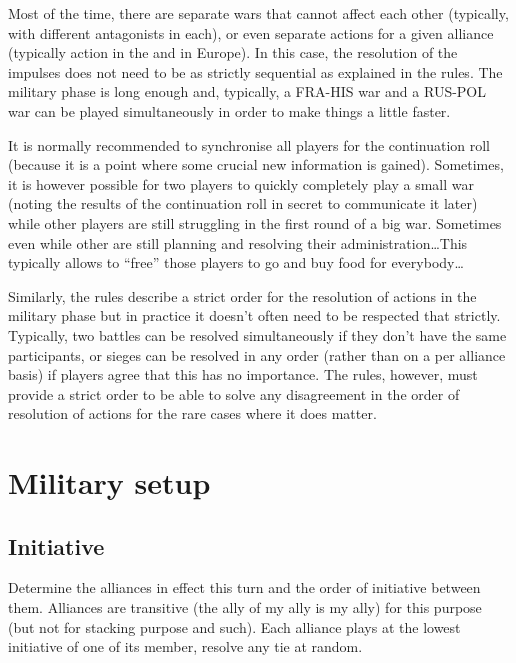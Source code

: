 \begin{playtip}[Simultaneity]
  Most of the time, there are separate wars that cannot affect each other
  (typically, with different antagonists in each), or even separate actions
  for a given alliance (typically action in the \ROTW and in Europe). In this
  case, the resolution of the impulses does not need to be as strictly
  sequential as explained in the rules. The military phase is long enough and,
  typically, a FRA-HIS war and a RUS-POL war can be played simultaneously in
  order to make things a little faster.

  It is normally recommended to synchronise all players for the continuation
  roll (because it is a point where some crucial new information is
  gained). Sometimes, it is however possible for two players to quickly
  completely play a small war (noting the results of the continuation roll in
  secret to communicate it later) while other players are still struggling in
  the first round of a big war. Sometimes even while other are still planning
  and resolving their administration\ldots This typically allows to ``free''
  those players to go and buy food for everybody\ldots

  \smallskip

  Similarly, the rules describe a strict order for the resolution of actions
  in the military phase but in practice it doesn't often need to be respected
  that strictly. Typically, two battles can be resolved simultaneously if they
  don't have the same participants, or sieges can be resolved in any order
  (rather than on a per alliance basis) if players agree that this has no
  importance. The rules, however, must provide a strict order to be able to
  solve any disagreement in the order of resolution of actions for the rare
  cases where it does matter.
\end{playtip}

\section{Military setup}
\label{chMilitary:Military setup}
\subsection{Initiative}
Determine the alliances in effect this turn and the order of initiative
between them. Alliances are transitive (the ally of my ally is my ally) for
this purpose (but not for stacking purpose and such). Each alliance plays at
the lowest initiative of one of its member, resolve any tie at random.

